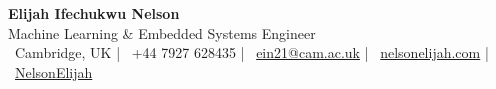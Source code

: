\begin{center}
    \LARGE{\textbf{Elijah Ifechukwu Nelson}}\\
    \vspace{1mm}
    \large{Machine Learning \& Embedded Systems Engineer}\\
    \vspace{2mm}
    \normalsize{
        \faMapMarker*~Cambridge, UK \quad|\quad
        \faPhone~+44 7927 628435 \quad|\quad
        \faEnvelope~\href{mailto:ein21@cam.ac.uk}{ein21@cam.ac.uk} \quad|\quad
        \faGlobe~\href{https://www.nelsonelijah.com}{nelsonelijah.com} \quad|\quad
        \faLinkedin~\href{https://www.linkedin.com/in/nelson-elijah/}{NelsonElijah}
    }
\end{center}
